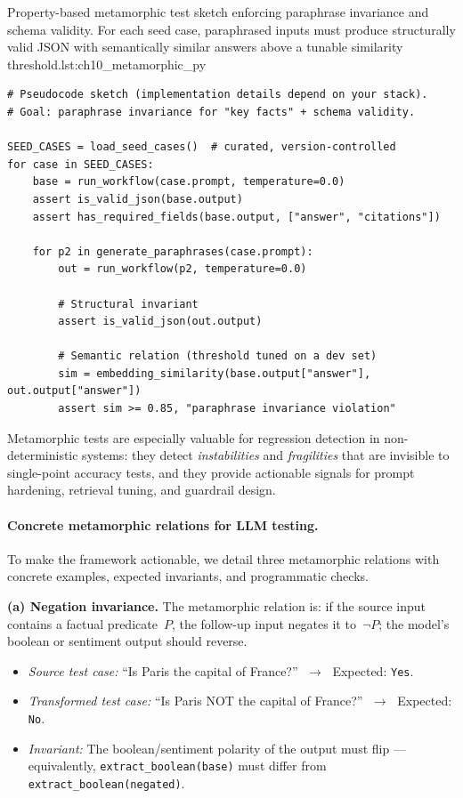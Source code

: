 \begin{codebox}{Property-based metamorphic test sketch enforcing paraphrase invariance and schema validity. For each seed case, paraphrased inputs must produce structurally valid JSON with semantically similar answers above a tunable similarity threshold.}{lst:ch10_metamorphic_py}
\begin{verbatim}
# Pseudocode sketch (implementation details depend on your stack).
# Goal: paraphrase invariance for "key facts" + schema validity.

SEED_CASES = load_seed_cases()  # curated, version-controlled
for case in SEED_CASES:
    base = run_workflow(case.prompt, temperature=0.0)
    assert is_valid_json(base.output)
    assert has_required_fields(base.output, ["answer", "citations"])

    for p2 in generate_paraphrases(case.prompt):
        out = run_workflow(p2, temperature=0.0)

        # Structural invariant
        assert is_valid_json(out.output)

        # Semantic relation (threshold tuned on a dev set)
        sim = embedding_similarity(base.output["answer"], out.output["answer"])
        assert sim >= 0.85, "paraphrase invariance violation"
\end{verbatim}
\end{codebox}

Metamorphic tests are especially valuable for regression detection in non-deterministic systems: they detect \emph{instabilities} and \emph{fragilities} that are invisible to single-point accuracy tests, and they provide actionable signals for prompt hardening, retrieval tuning, and guardrail design.

\paragraph{Concrete metamorphic relations for LLM testing.}
To make the framework actionable, we detail three metamorphic relations with concrete examples, expected invariants, and programmatic checks.

\medskip
\noindent\textbf{(a) Negation invariance.}
The metamorphic relation is: if the source input contains a factual predicate~$P$, the follow-up input negates it to~$\lnot P$; the model's boolean or sentiment output should reverse.

\begin{itemize}[leftmargin=1.5em, itemsep=2pt]
    \item \emph{Source test case:} ``Is Paris the capital of France?'' $\;\to\;$ Expected: \texttt{Yes}.
    \item \emph{Transformed test case:} ``Is Paris NOT the capital of France?'' $\;\to\;$ Expected: \texttt{No}.
    \item \emph{Invariant:} The boolean/sentiment polarity of the output must flip --- equivalently, \texttt{extract\_boolean(base)} must differ from \texttt{extract\_boolean(negated)}.
\end{itemize}

